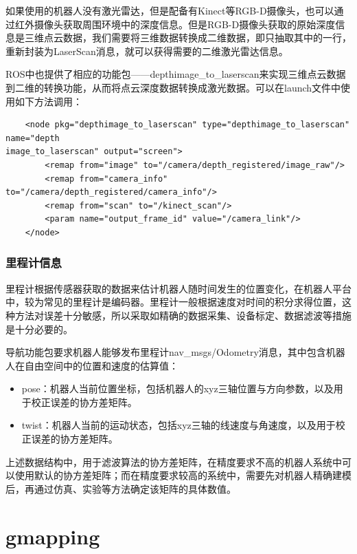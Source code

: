 \documentclass[10pt, oneside]{book}
\begin{document}
如果使用的机器人没有激光雷达，但是配备有Kinect等RGB-D摄像头，也可以通过红外摄像头获取周围环境中的深度信息。但是RGB-D摄像头获取的原始深度信息是三维点云数据，我们需要将三维数据转换成二维数据，即只抽取其中的一行，重新封装为LaserScan消息，就可以获得需要的二维激光雷达信息。

ROS中也提供了相应的功能包——depthimage\_to\_laserscan来实现三维点云数据到二维的转换功能，从而将点云深度数据转换成激光数据。可以在launch文件中使用如下方法调用：

\begin{verbatim}
    <node pkg="depthimage_to_laserscan" type="depthimage_to_laserscan" name="depth
image_to_laserscan" output="screen">
        <remap from="image" to="/camera/depth_registered/image_raw"/> 
        <remap from="camera_info" to="/camera/depth_registered/camera_info"/>
        <remap from="scan" to="/kinect_scan"/>
        <param name="output_frame_id" value="/camera_link"/>
    </node>
\end{verbatim}

\subsubsection{里程计信息}

里程计根据传感器获取的数据来估计机器人随时间发生的位置变化，在机器人平台中，较为常见的里程计是编码器。里程计一般根据速度对时间的积分求得位置，这种方法对误差十分敏感，所以采取如精确的数据采集、设备标定、数据滤波等措施是十分必要的。

导航功能包要求机器人能够发布里程计nav\_msgs/Odometry消息，其中包含机器人在自由空间中的位置和速度的估算值：

\begin{itemize}
    \item pose：机器人当前位置坐标，包括机器人的xyz三轴位置与方向参数，以及用于校正误差的协方差矩阵。
    \item twist：机器人当前的运动状态，包括xyz三轴的线速度与角速度，以及用于校正误差的协方差矩阵。
\end{itemize}

\textcolor[rgb]{1,0,0}{上述数据结构中，用于滤波算法的协方差矩阵，在精度要求不高的机器人系统中可以使用默认的协方差矩阵；而在精度要求较高的系统中，需要先对机器人精确建模后，再通过仿真、实验等方法确定该矩阵的具体数值。}

\section{gmapping}
\end{document}

